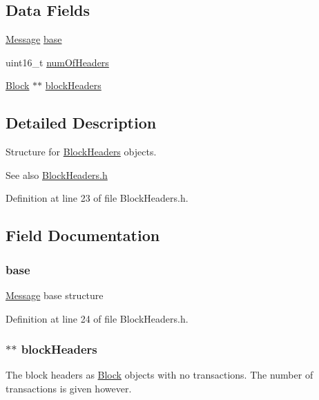 \subsection*{Data Fields}
\begin{DoxyCompactItemize}
\item 
\hyperlink{struct_message}{Message} \hyperlink{struct_block_headers_a8987f797adf70c3e174fd64cc68bc933}{base}
\item 
uint16\_\-t \hyperlink{struct_block_headers_a9cfb2de0666e1e88b621171a97ba801e}{numOfHeaders}
\item 
\hyperlink{struct_block}{Block} $\ast$$\ast$ \hyperlink{struct_block_headers_a33e1983765c280515297ab5b3a4640e0}{blockHeaders}
\end{DoxyCompactItemize}


\subsection{Detailed Description}
Structure for \hyperlink{struct_block_headers}{BlockHeaders} objects. 

\begin{DoxySeeAlso}{See also}
\hyperlink{_block_headers_8h}{BlockHeaders.h} 
\end{DoxySeeAlso}


Definition at line 23 of file BlockHeaders.h.



\subsection{Field Documentation}
\hypertarget{struct_block_headers_a8987f797adf70c3e174fd64cc68bc933}{
\subsubsection[{base}]{ {\bf base}}}
\label{struct_block_headers_a8987f797adf70c3e174fd64cc68bc933}
\hyperlink{struct_message}{Message} base structure 

Definition at line 24 of file BlockHeaders.h.

\hypertarget{struct_block_headers_a33e1983765c280515297ab5b3a4640e0}{
\subsubsection[{blockHeaders}]{$\ast$$\ast$ {\bf blockHeaders}}}
\label{struct_block_headers_a33e1983765c280515297ab5b3a4640e0}
The block headers as \hyperlink{struct_block}{Block} objects with no transactions. The number of transactions is given however. 


